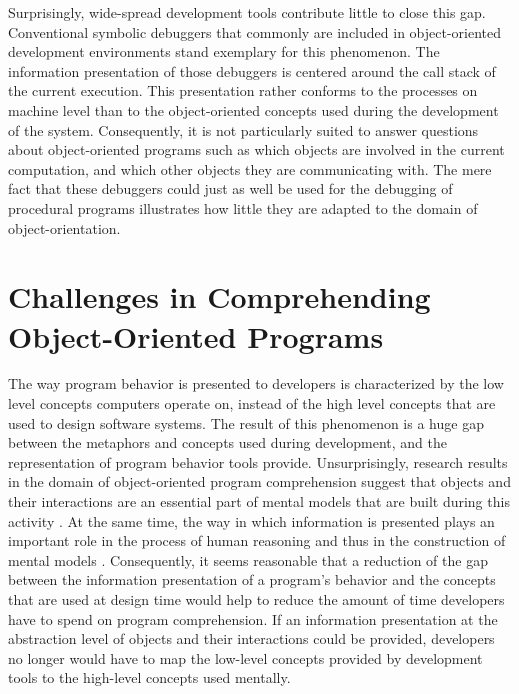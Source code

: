 Surprisingly, wide-spread development tools contribute little to close this gap.
Conventional symbolic debuggers that commonly are included in object-oriented development environments stand exemplary for this phenomenon.
The information presentation of those debuggers is centered around the call stack of the current execution.
This presentation rather conforms to the processes on machine level than to the object-oriented concepts used during the development of the system.
Consequently, it is not particularly suited to answer questions about object-oriented programs such as which objects are involved in the current computation, and which other objects they are communicating with.
The mere fact that these debuggers could just as well be used for the debugging of procedural programs illustrates how little they are adapted to the domain of object-orientation.

\section[Challenges in Comprehending Object-Oriented Programs]{Challenges in Comprehending Object-Oriented Programs%
}
The way program behavior is presented to developers is characterized by the low level concepts computers operate on, instead of the high level concepts that are used to design software systems.
The result of this phenomenon is a huge gap between the metaphors and concepts used during development, and the representation of program behavior tools provide.
Unsurprisingly, research results in the domain of object-oriented program comprehension suggest that objects and their interactions are an essential part of mental models that are built during this activity \cite{burkhardt_mental_1997}.
At the same time, the way in which information is presented plays an important role in the process of human reasoning and thus in the construction of mental models \cite{diehl_software_2007}.
Consequently, it seems reasonable that a reduction of the gap between the information presentation of a program's behavior and the concepts that are used at design time would help to reduce the amount of time developers have to spend on program comprehension.
If an information presentation at the abstraction level of objects and their interactions could be provided, developers no longer would have to map the low-level concepts provided by development tools to the high-level concepts used mentally.

